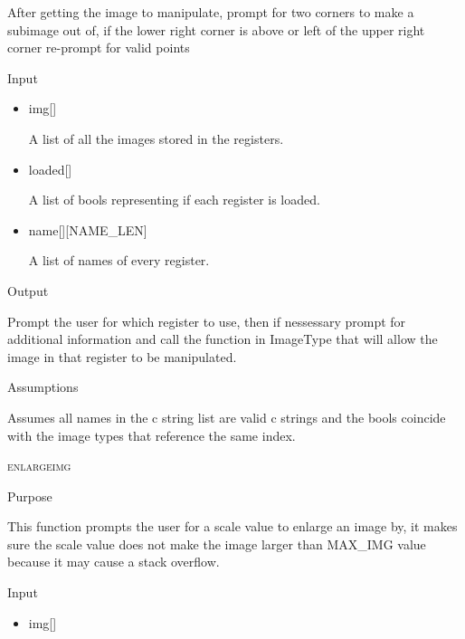 \documentclass[pdftex, 11pt]{article}
\begin{document}
\begin{description}
\begin{description}
				After getting the image to manipulate, prompt for two corners to make a
				subimage out of, if the lower right corner is above or left of the upper
				right corner re-prompt for valid points

			\item{Input}

				\begin{itemize}

					\item{img[]}

						A list of all the images stored in the registers.

					\item{loaded[]}

						A list of bools representing if each register is loaded.

					\item{name[][NAME\_LEN]}

						A list of names of every register.

				\end{itemize}

			\item{Output}

				Prompt the user for which register to use, then if nessessary
				prompt for additional information and call the function
				in ImageType that will allow the image in that register to
				be manipulated.

			\item{Assumptions}

				Assumes all names in the c string list are valid c
				strings and the bools coincide with the image types that
				reference the same index.

		\end{description}



	\item{\textsc{enlargeimg}}
		\begin{description}
			\item{Purpose}

				This function prompts the user for a scale value to enlarge an image by, it
				makes sure the scale value does not make the image larger than MAX\_IMG value
				because it may cause a stack overflow.

			\item{Input}

				\begin{itemize}

					\item{img[]}


\end{itemize}
\end{description}
\end{description}
\end{document}

